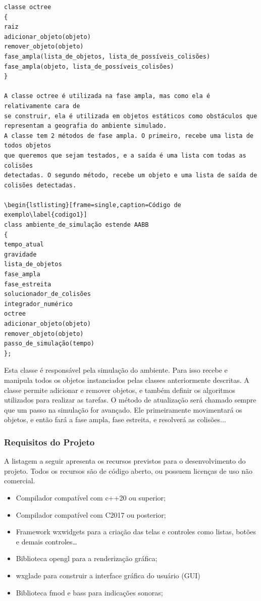 \begin{lstlisting}[frame=single,caption=Código de exemplo\label{codigo1}]
classe octree
{
raiz
adicionar_objeto(objeto)
remover_objeto(objeto)
fase_ampla(lista_de_objetos, lista_de_possíveis_colisões)
fase_ampla(objeto, lista_de_possíveis_colisões)
}

A classe octree é utilizada na fase ampla, mas como ela é relativamente cara de
se construir, ela é utilizada em objetos estáticos como obstáculos que representam a geografia do ambiente simulado.
A classe tem 2 métodos de fase ampla. O primeiro, recebe uma lista de todos objetos
que queremos que sejam testados, e a saída é uma lista com todas as colisões
detectadas. O segundo método, recebe um objeto e uma lista de saída de colisões detectadas.

\begin{lstlisting}[frame=single,caption=Código de exemplo\label{codigo1}]
class ambiente_de_simulação estende AABB
{
tempo_atual
gravidade
lista_de_objetos
fase_ampla
fase_estreita
solucionador_de_colisões
integrador_numérico
octree
adicionar_objeto(objeto)
remover_objeto(objeto)
passo_de_simulação(tempo)
};
\end{lstlisting}

Esta classe é responsável pela simulação do ambiente. Para isso recebe e manipula todos os objetos instanciados pelas classes anteriormente descritas. A classe permite adicionar e remover objetos, e também definir os algoritmos utilizados
para realizar as tarefas.
O método de atualização será chamado sempre que um passo na simulação for avançado.
Ele primeiramente movimentará os objetos, e então fará a fase ampla, fase
estreita, e resolverá as colisões...

\subsubsection{Requisitos do Projeto}

A listagem a seguir apresenta os recursos previstos para o desenvolvimento do projeto.
Todos os  recursos são  de código aberto, ou possuem licenças de uso não comercial.

\begin{itemize}
\item Compilador compatível com c++20 ou superior;
\item Compilador compatível com C2017 ou posterior;
\item Framework wxwidgets para a criação das telas e controles como listas, botões e demais controles…
\item Biblioteca opengl para a renderização gráfica;
\item wxglade para construir a interface gráfica do usuário (GUI)
\item Biblioteca fmod e bass para indicações sonoras;
\end{itemize}

